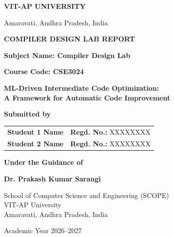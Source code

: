 \documentclass[12pt,a4paper]{article}
\begin{document}
\begin{titlepage}
\begin{center}

\vspace*{0.5cm}
{\Large\bfseries VIT-AP UNIVERSITY}
\vspace{0.3cm}

{\large Amaravati, Andhra Pradesh, India}
\vspace{1.2cm}

{\Large\bfseries COMPILER DESIGN LAB REPORT}
\vspace{0.4cm}

{\large \textbf{Subject Name: Compiler Design Lab}}
\vspace{0.15cm}

{\large \textbf{Course Code: CSE3024}}
\vspace{1cm}

{\LARGE\bfseries
ML-Driven Intermediate Code Optimization:\\
A Framework for Automatic Code Improvement
}
\vspace{1.2cm}

\textbf{Submitted by}
\vspace{0.4cm}

\begin{tabular}{ll}
\textbf{Student 1 Name} & \textbf{Regd. No.:} XXXXXXXX \\[0.4cm]
\textbf{Student 2 Name} & \textbf{Regd. No.:} XXXXXXXX \\
\end{tabular}
\vspace{1.2cm}

\textbf{Under the Guidance of}
\vspace{0.3cm}

\textbf{Dr. Prakash Kumar Sarangi}
\vspace{1cm}

{\large
School of Computer Science and Engineering (SCOPE)\\
VIT-AP University\\
Amaravati, Andhra Pradesh, India
}
\vspace{0.4cm}

{\large Academic Year 2026--2027}

\end{center}
\end{titlepage}

\end{document}
